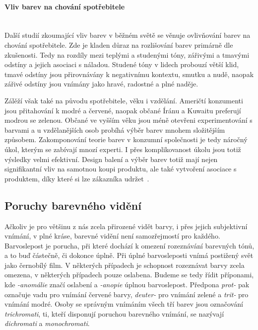 \paragraph{Vliv barev na chování spotřebitele}\mbox{}\\
Další studií zkoumající vliv barev v běžném světě se věnuje ovlivňování barev na chování spotřebitele. Zde je kladen důraz na rozlišování
barev primárně dle zkušenosti. Tedy na rozdíly mezi teplými a studenými tóny, zářivými a tmavými odstíny a jejich asociaci s náladou. 
Studené tóny v lidech probouzí větší klid, tmavé odstíny jsou přirovnávány k negativnímu kontextu, smutku a nudě, naopak zářivé odstíny jsou vnímány jako hravé, 
radostné a plné naděje.

Zálěží však také na původu spotřebitele, věku i vzdělání. Američtí konzumenti jsou přitahování k modré a červené, naopak občané Íránu a Kuwaitu
preferují modrou se zelenou. Občané ve vyšším věku jsou méně otevřeni experimentování s barvami a u vzdělanějších osob probíhá výběr barev mnohem složitějším
způsobem. Zakomponování teorie barev v konzumní společnosti je tedy náročný úkol, kterým se zabívají mnozí experti. I přes komplikovanost úkolu
jsou totiž výsledky velmi efektivní. Design balení a výběr barev totiž mají nejen signifikantní vliv na samotnou koupi produktu, ale také vytvoření asociace
s produktem, díky které si lze zákazníka udržet~\cite{consumer-behavior}.

\subsection{Poruchy barevného vidění}
Ačkoliv je pro většinu z nás zcela přirozené vidět barvy, i přes jejich subjektivní vnímání, v plné kráse, barevné vidění není samozřejmostí pro každého.
Barvoslepost je porucha, při které dochází k omezení rozeznávání barevných tónů, a to buď částečně, či dokonce úplně. Při úplné barvosleposti vnímá postižený svět
jako černobílý film. V některých případech je schopnost rozeznávat barvy zcela omezena, v některých případech pouze oslabena. Budeme se tedy řídit příponami, kde
\emph{-anomálie} značí oslabení a \emph{-anopie} úplnou barvoslepost. Předpona \emph{prot-} pak označuje vadu pro vnímání červené barvy, \emph{deuter-} pro vnímání zelené a \emph{trit- }
pro vnímání modré. Osoby se správným vnímáním všech tří barev jsou označování \emph{trichromati}, ti, kteří disponují poruchou barevného vnímání, se nazývají \emph{dichromati} a \emph{monochromati}.
